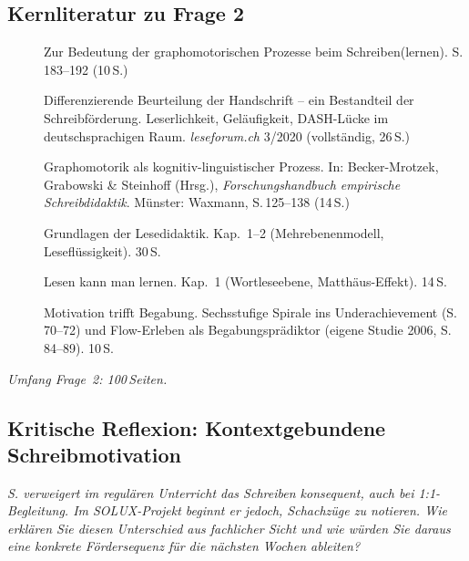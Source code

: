 \documentclass[ngerman, a4paper]{article}
\begin{document}
\subsection{Kernliteratur zu Frage 2}
 
\begin{description}
  \item[\cite{sturm2016graphomotorik}] Zur Bedeutung der graphomotorischen
    Prozesse beim Schreiben(lernen). S.\,183--192 (10\,S.)
  \item[\cite{hurschler2020handschriftbeurteilung}] Differenzierende
    Beurteilung der Handschrift -- ein Bestandteil der Schreibförderung.
    Leserlichkeit, Geläufigkeit, DASH-Lücke im deutschsprachigen Raum.
    \textit{leseforum.ch} 3/2020 (vollständig, 26\,S.)
  \item[\cite{nottbusch2017graphomotorik}] Graphomotorik als
    kognitiv-linguistischer Prozess. In: Becker-Mrotzek, Grabowski \&
    Steinhoff (Hrsg.), \textit{Forschungshandbuch empirische Schreibdidaktik}.
    Münster: Waxmann, S.\,125--138 (14\,S.)
  \item[\cite{rosebrock2010grundlagen}] Grundlagen der Lesedidaktik.
    Kap.~1--2 (Mehrebenenmodell, Leseflüssigkeit). 30\,S.
  \item[\cite{gold2018lesenkannmanlernen}] Lesen kann man lernen.
    Kap.~1 (Wortleseebene, Matthäus-Effekt). 14\,S.
  \item[\cite{lehwald2017motivation}] Motivation trifft Begabung.
    Sechsstufige Spirale ins Underachievement (S.\,70--72) und Flow-Erleben
    als Begabungsprädiktor (eigene Studie 2006, S.\,84--89). 10\,S.
\end{description}
 
\textit{Umfang Frage~2: 100\,Seiten.}
 

 

\subsection{Kritische Reflexion: Kontextgebundene Schreibmotivation}


\begin{tcolorbox}[colback=gray!5, colframe=gray!50, title=Weiterführende Diskurslinie]
\itshape
S. verweigert im regulären Unterricht das Schreiben konsequent, auch bei
1:1-Begleitung. Im SOLUX-Projekt beginnt er jedoch, Schachzüge zu notieren.
Wie erklären Sie diesen Unterschied aus fachlicher Sicht und wie würden Sie
daraus eine konkrete Fördersequenz für die nächsten Wochen ableiten?
\end{tcolorbox}
\end{document}
